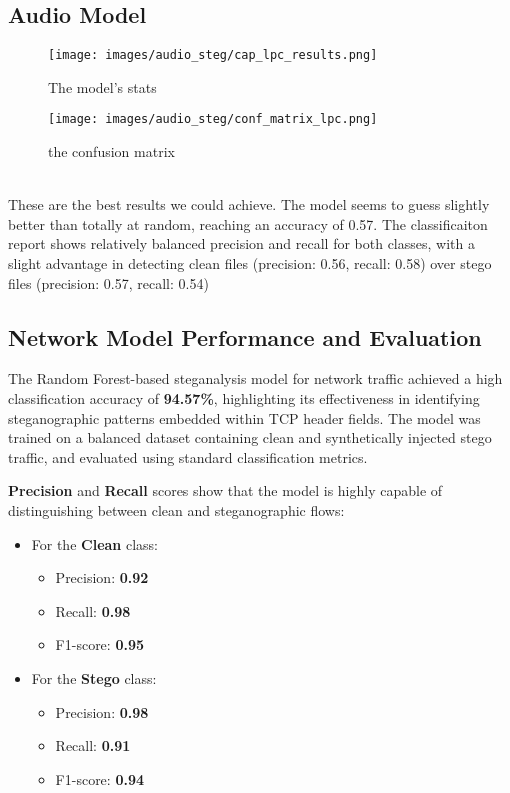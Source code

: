 \documentclass[12pt]{article}
\begin{document}
\subsection{Audio Model}
\begin{figure}[H]
    \centering
    \begin{minipage}[b]{0.45\textwidth}
        \centering
        \texttt{[image: images/audio\_steg/cap\_lpc\_results.png]}
        \caption{The model's stats}
    \end{minipage}
    \hfill
    \begin{minipage}[b]{0.45\textwidth}
        \centering
        \texttt{[image: images/audio\_steg/conf\_matrix\_lpc.png]}
        \caption{the confusion matrix}
    \end{minipage}
\end{figure}
\\ 
These are the best results we could achieve. The model seems to guess slightly better than totally at random, reaching an accuracy of 0.57. The classificaiton report shows relatively balanced precision and recall for both classes,  with a slight advantage in detecting clean files (precision: 0.56, recall: 0.58) over stego files (precision: 0.57, recall: 0.54)


\subsection{Network Model Performance and Evaluation}

The Random Forest-based steganalysis model for network traffic achieved a high classification accuracy of \textbf{94.57\%}, highlighting its effectiveness in identifying steganographic patterns embedded within TCP header fields. The model was trained on a balanced dataset containing clean and synthetically injected stego traffic, and evaluated using standard classification metrics.

\vspace{0.3cm}
\textbf{Precision} and \textbf{Recall} scores show that the model is highly capable of distinguishing between clean and steganographic flows:
\begin{itemize}
    \item For the \textbf{Clean} class:
    \begin{itemize}
        \item Precision: \textbf{0.92}
        \item Recall: \textbf{0.98}
        \item F1-score: \textbf{0.95}
    \end{itemize}
    \item For the \textbf{Stego} class:
    \begin{itemize}
        \item Precision: \textbf{0.98}
        \item Recall: \textbf{0.91}
        \item F1-score: \textbf{0.94}
    \end{itemize}
\end{itemize}
\end{document}
